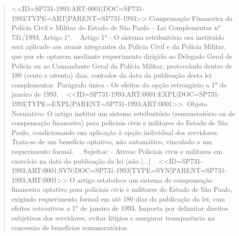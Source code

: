 \documentclass{IOS-Book-Article}
\begin{document}
\begin{quote}\footnotesize\ttfamily\raggedright
<<ID=SP731-1993:ART:0001|\allowbreak{}DOC=SP731-1993|\allowbreak{}TYPE=ART|\allowbreak{}PARENT=SP731-1993>>\newline
[NORMA]\newline
Compensação Financeira da Polícia Civil e Militar do Estado de São Paulo -- Lei Complementar n° 731/1993, Artigo 1°.\newline
~\newline
[CONTEÚDO]\newline
Artigo 1° - O sistema retribuitório ora instituído será aplicado aos atuais integrantes da Polícia Civil e da Polícia Militar, que por ele optarem mediante requerimento dirigido ao Delegado Geral de Polícia ou ao Comandante Geral da Polícia Militar, protocolado dentro de 180 (cento e oitenta) dias, contados da data da publicação desta lei complementar.\newline
Parágrafo único - Os efeitos da opção retroagirão a 1° de janeiro de 1993.\newline
~\newline
<<ID=SP731-1993:ART:0001:EXPL|\allowbreak{}DOC=SP731-1993|\allowbreak{}TYPE=EXPL|\allowbreak{}PARENT=SP731-1993:ART:0001>>\newline
[EXPLICAÇÃO]. Objeto Normativo:\newline
 O artigo institui um sistema retribuitório (remuneratório ou de compensação financeira) para policiais civis e militares do Estado de São Paulo, condicionando sua aplicação à opção individual dos servidores. Trata-se de um benefício optativo, não automático, vinculado a um requerimento formal.\newline
~. Sujeitos:\newline
 - Ativos: Policiais civis e militares em exercício na data da publicação da lei (não [...]\newline
~\newline
<<ID=SP731-1993:ART:0001:SYN|\allowbreak{}DOC=SP731-1993|\allowbreak{}TYPE=SYN|\allowbreak{}PARENT=SP731-1993:ART:0001>>\newline
[SÍNTESE]\newline
O artigo estabelece um sistema de compensação financeira optativo para policiais civis e militares do Estado de São Paulo, exigindo requerimento formal em até 180 dias da publicação da lei, com efeitos retroativos a 1° de janeiro de 1993. Importa por delimitar direitos subjetivos dos servidores, evitar litígios e assegurar transparência na concessão de benefícios remuneratórios.\newline

\end{quote}
\end{document}
